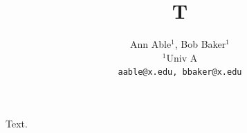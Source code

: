 \documentclass{article}
\title{T}
\author{Ann Able$^1$, Bob Baker$^1$ \\ $^1$Univ A \\ \texttt{\fontfamily{pcr}\selectfont aable@x.edu, bbaker@x.edu}}
\begin{document}
\maketitle
Text.
\end{document}
